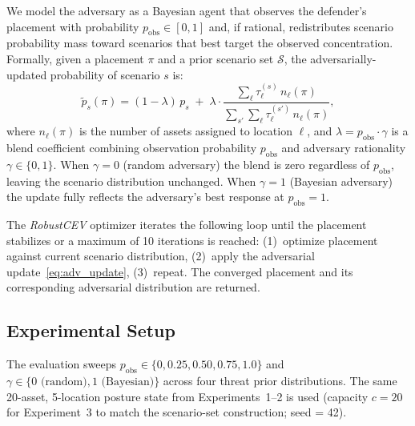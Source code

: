 \documentclass[11pt]{article}
\begin{document}
We model the adversary as a Bayesian agent that observes the
defender's placement with probability $p_\mathrm{obs} \in [0, 1]$
and, if rational, redistributes scenario probability mass toward
scenarios that best target the observed concentration.
Formally, given a placement $\pi$ and a prior scenario set
$\mathcal{S}$, the adversarially-updated probability of scenario $s$ is:
\begin{equation}
    \tilde{p}_s(\pi) =
    (1 - \lambda)\, p_s
    \;+\;
    \lambda \cdot
    \frac{\displaystyle\sum_{\ell} \tau_\ell^{(s)}\, n_\ell(\pi)}
         {\displaystyle\sum_{s'} \sum_{\ell} \tau_\ell^{(s')}\, n_\ell(\pi)},
    \label{eq:adv_update}
\end{equation}
where $n_\ell(\pi)$ is the number of assets assigned to location $\ell$,
and $\lambda = p_\mathrm{obs} \cdot \gamma$ is a blend coefficient
combining observation probability $p_\mathrm{obs}$ and adversary
rationality $\gamma \in \{0, 1\}$.  When $\gamma = 0$ (random adversary)
the blend is zero regardless of $p_\mathrm{obs}$, leaving the scenario
distribution unchanged.  When $\gamma = 1$ (Bayesian adversary) the
update fully reflects the adversary's best response at $p_\mathrm{obs} = 1$.

The \emph{RobustCEV} optimizer iterates the following loop until the
placement stabilizes or a maximum of 10 iterations is reached:
(1)~optimize placement against current scenario distribution,
(2)~apply the adversarial update~\eqref{eq:adv_update},
(3)~repeat.
The converged placement and its corresponding adversarial distribution
are returned.

\subsection{Experimental Setup}
\label{sec:exp3:setup}

The evaluation sweeps $p_\mathrm{obs} \in \{0, 0.25, 0.50, 0.75, 1.0\}$
and $\gamma \in \{0\text{ (random)}, 1\text{ (Bayesian)}\}$ across
four threat prior distributions.  The same 20-asset, 5-location
posture state from Experiments~1--2 is used (capacity $c = 20$ for
Experiment~3 to match the scenario-set construction; seed = 42).
\end{document}
